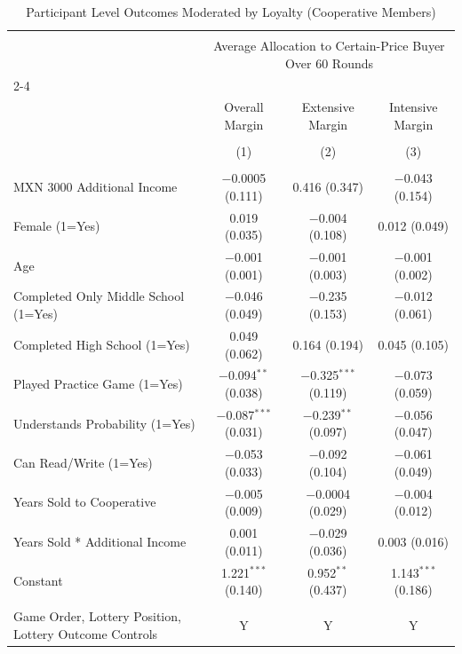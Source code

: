 
\begin{table}[!htbp] \centering 
  \caption{Participant Level Outcomes Moderated by Loyalty (Cooperative Members)} 
  \label{participant_level_outcomes_coop_loyalty} 
\begin{tabular}{@{\extracolsep{5pt}}lccc} 
\\[-1.8ex]\hline 
\hline \\[-1.8ex] 
 & \multicolumn{3}{c}{Average Allocation to Certain-Price Buyer Over 60 Rounds} \\ 
\cline{2-4} 
\\[-1.8ex] & Overall Margin & Extensive Margin & Intensive Margin \\ 
\\[-1.8ex] & (1) & (2) & (3)\\ 
\hline \\[-1.8ex] 
 MXN 3000 Additional Income & $-$0.0005 (0.111) & 0.416 (0.347) & $-$0.043 (0.154) \\ 
  Female (1=Yes) & 0.019 (0.035) & $-$0.004 (0.108) & 0.012 (0.049) \\ 
  Age & $-$0.001 (0.001) & $-$0.001 (0.003) & $-$0.001 (0.002) \\ 
  Completed Only Middle School (1=Yes) & $-$0.046 (0.049) & $-$0.235 (0.153) & $-$0.012 (0.061) \\ 
  Completed High School (1=Yes) & 0.049 (0.062) & 0.164 (0.194) & 0.045 (0.105) \\ 
  Played Practice Game (1=Yes) & $-$0.094$^{**}$ (0.038) & $-$0.325$^{***}$ (0.119) & $-$0.073 (0.059) \\ 
  Understands Probability (1=Yes) & $-$0.087$^{***}$ (0.031) & $-$0.239$^{**}$ (0.097) & $-$0.056 (0.047) \\ 
  Can Read/Write (1=Yes) & $-$0.053 (0.033) & $-$0.092 (0.104) & $-$0.061 (0.049) \\ 
  Years Sold to Cooperative & $-$0.005 (0.009) & $-$0.0004 (0.029) & $-$0.004 (0.012) \\ 
  Years Sold * Additional Income & 0.001 (0.011) & $-$0.029 (0.036) & 0.003 (0.016) \\ 
  Constant & 1.221$^{***}$ (0.140) & 0.952$^{**}$ (0.437) & 1.143$^{***}$ (0.186) \\ 
 \hline \\[-1.8ex] 
Game Order, Lottery Position, Lottery Outcome Controls & Y & Y & Y \\ 

\end{tabular}
\end{table}
